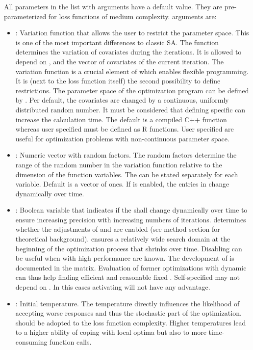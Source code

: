All parameters in the list with  arguments have a default value. They are pre-parameterized for loss functions of medium complexity.  arguments are:
\begin{itemize}
\item {}: Variation function that allows the user to restrict the parameter space. This is one of the most important differences to classic SA. The function determines the variation of covariates during the iterations. It is allowed to depend on ,  and the vector of covariates of the current iteration. The variation function is a crucial element of  which enables flexible programming. It is (next to the loss function itself) the second possibility to define restrictions. The parameter space of the optimization program can be defined by . Per default, the covariates are changed by a continuous, uniformly distributed random number. It must be considered that defining specific  can increase the calculation time. The default  is a compiled C++ function whereas user specified  must be defined as R functions. User specified  are useful for optimization problems with non-continuous parameter space.
\item {}: Numeric vector with random factors. The random factors determine the range of the random number in the variation function  relative to the dimension of the function variables. The  can be stated separately for each variable. Default is a vector of ones. If  is enabled, the entries in  change dynamically over time.
\item {}: Boolean variable that indicates if the  shall change dynamically over time to ensure increasing precision with increasing numbers of iterations.  determines whether the adjustments of \citet{corana_1987} and \citet{pronzato_1984} are enabled (see method section for theoretical background).  ensures a relatively wide search domain at the beginning of the optimization process that shrinks over time. Disabling  can be useful when  with high performance are known. The development of  is documented in the  matrix. Evaluation of former optimizations with dynamic  can thus help finding efficient and reasonable fixed . Self-specified  may not depend on . In this cases activating  will not have any advantage.
\item {}: Initial temperature. The temperature directly influences the likelihood of accepting worse responses and thus the stochastic part of the optimization.  should be adopted to the loss function complexity. Higher temperatures lead to a higher ability of coping with local optima but also to more time-consuming function calls.

\end{itemize}
